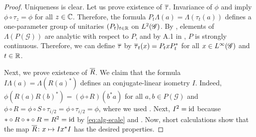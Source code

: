 \begin{proof}
  Uniqueness is clear.  Let us prove existence of $\overline{\tau}$.
  Invariance of $\phi$ and \cite[Theorem 3.49]{DCT1} imply $\phi \circ
  \tau_{z} = \phi$ for all $z\in \mathbb{C}$. Therefore, the formula
  $P_{t}\Lambda(a) = \Lambda(\tau_{t}(a))$ defines a one-parameter
  group of unitaries $(P_{t})_{t\in \mathbb{R}}$ on $L^{2}(\mathscr{G})$. By \cite[Theorem
  3.49]{DCT1}, elements of $\Lambda(P(\mathscr{G}))$ are analytic with
  respect to $P$, and by A.1 in \cite{Taksak2}, $P$ is strongly
  continuous.  Therefore, we can define $\overline{\tau}$ by  $\overline{\tau}_{t}(x)=
  P_{t}xP_{t}^{*}$ for all $x\in L^{\infty}(\mathscr{G})$ and $t\in \mathbb{R}$.
  

  Next, we prove existence of $\overline{R}$. We claim that the formula $
  I\Lambda(a) = \Lambda(R(a)^{*})$ defines an conjugate-linear
  isometry $I$. Indeed, $\phi(R(a)R(b)^{*})= (\phi\circ R)(b^{*}a)$
  for all $a,b\in P(\mathscr{G})$ and $\phi \circ R=\phi \circ S \circ
  \tau_{i/2} = \phi \circ \tau_{i/2}=\phi$, where we used \cite[Lemma
  1.30]{DCT1}. Next, $I^{2} = \operatorname{id}$ because $*\circ R \circ * \circ R=
  R^{2}=\operatorname{id}$ by \eqref{eq:alg-scale} and \cite[Corollary 1.42]{DCT1}. Now,  short calculations show
  that the map $\overline{R} \colon x \mapsto Ix^{*}I$ has the desired
  properties.


\end{proof}
